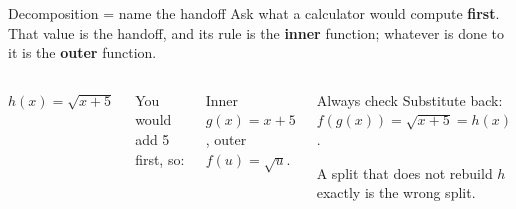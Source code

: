 \documentclass[aspectratio=169, 11pt]{beamer}
\begin{document}
\begin{frame}[t, plain]

  \begin{block}{Decomposition = name the handoff}
    Ask what a calculator would compute \textbf{first}. That value is the handoff, and its rule
    is the \textbf{inner} function; whatever is done to it is the \textbf{outer} function.
  \end{block}

  \bigskip
  \begin{columns}[T, onlytextwidth]
      \(h(x) = \sqrt{x + 5}\)

      \smallskip
      You would add 5 first, so:

      \smallskip
      Inner \(g(x) = x + 5\), \quad outer \(f(u) = \sqrt{u}\).

      \begin{block}{Always check}
        Substitute back: \(f(g(x)) = \sqrt{x+5} = h(x)\). \checkmark

        \smallskip
        A split that does not rebuild \(h\) exactly is the wrong split.
      \end{block}
  \end{columns}
\end{frame}
\end{document}
